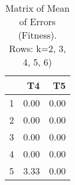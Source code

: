 \begin{table}[ht]
\centering
\begin{tabular}{rrr}
  \hline
 & T4 & T5 \\ 
  \hline
1 & 0.00 & 0.00 \\ 
  2 & 0.00 & 0.00 \\ 
  3 & 0.00 & 0.00 \\ 
  4 & 0.00 & 0.00 \\ 
  5 & 3.33 & 0.00 \\ 
   \hline
\end{tabular}
\caption{Matrix of Mean of Errors (Fitness).  Rows: k=2, 3, 4, 5, 6)} 
\end{table}
